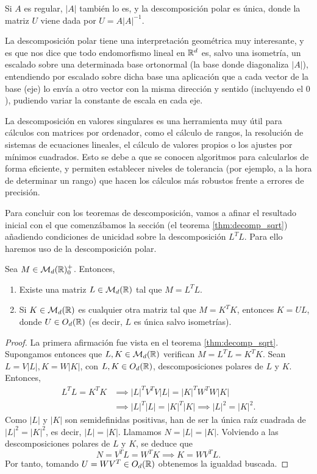 \begin{remark}
    Si $A$ es regular, $|A|$ también lo es, y la descomposición polar es única, donde la matriz $U$ viene dada por $U = A|A|^{-1}$.
\end{remark}

La descomposición polar tiene una interpretación geométrica muy interesante, y es que nos dice que todo endomorfismo lineal en $\mathbb{R}^d$ es, salvo una isometría, un escalado sobre una determinada base ortonormal (la base donde diagonaliza $|A|$), entendiendo por escalado sobre dicha base una aplicación que a cada vector de la base (eje) lo envía a otro vector con la misma dirección y sentido (incluyendo el $0$), pudiendo variar la constante de escala en cada eje.

La descomposición en valores singulares es una herramienta muy útil para cálculos con matrices por ordenador, como el cálculo de rangos, la resolución de sistemas de ecuaciones lineales, el cálculo de valores propios o los ajustes por mínimos cuadrados. Esto se debe a que se conocen algoritmos para calcularlos de forma eficiente, y permiten establecer niveles de tolerancia (por ejemplo, a la hora de determinar un rango) que hacen los cálculos más robustos frente a errores de precisión.

Para concluir con los teoremas de descomposición, vamos a afinar el resultado inicial con el que comenzábamos la sección (el teorema \ref{thm:decomp_sqrt}) añadiendo condiciones de unicidad sobre la descomposición $L^TL$. Para ello haremos uso de la descomposición polar.

\begin{thm} \label{thm:psd_decomposition}
    Sea $M \in \mathcal{M}_d(\mathbb{R})^+_0$. Entonces,
    \begin{enumerate}
        \item Existe una matriz $L \in \mathcal{M}_d(\mathbb{R})$ tal que $M = L^TL$.
        \item Si $K \in \mathcal{M}_d(\mathbb{R})$ es cualquier otra matriz tal que $M = K^TK$, entonces $K = UL$, donde $U \in O_d(\mathbb{R})$ (es decir, $L$ es única salvo isometrías).
    \end{enumerate}
\end{thm}

\begin{proof}
    La primera afirmación fue vista en el teorema \ref{thm:decomp_sqrt}. Supongamos entonces que $L, K \in \mathcal{M}_d(\mathbb{R})$ verifican $M = L^TL = K^TK$. Sean $L = V|L|, K = W|K|$, con $L, K \in O_d(\mathbb{R})$, descomposiciones polares de $L$ y $K$. Entonces,
    \begin{align*}
        L^TL = K^TK &\implies |L|^TV^TV|L| = |K|^TW^TW|K| \\
                    &\implies |L|^T|L| = |K|^T|K| \implies |L|^2 = |K|^2.
    \end{align*}
    Como $|L|$ y $|K|$ son semidefinidas positivas, han de ser la única raíz cuadrada de $|L|^2 = |K|^2$, es decir, $|L|=|K|$. Llamamos $N = |L| = |K|$. Volviendo a las descomposiciones polares de $L$ y $K$, se deduce que
    \[ N = V^TL = W^TK \implies K = WV^TL. \]
    Por tanto, tomando $U = WV^T \in O_d(\mathbb{R})$ obtenemos la igualdad buscada.
\end{proof}

